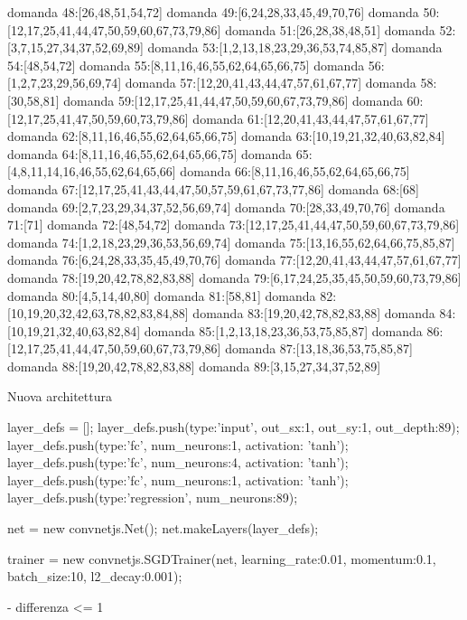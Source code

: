domanda 48:[26,48,51,54,72]
domanda 49:[6,24,28,33,45,49,70,76]
domanda 50:[12,17,25,41,44,47,50,59,60,67,73,79,86]
domanda 51:[26,28,38,48,51]
domanda 52:[3,7,15,27,34,37,52,69,89]
domanda 53:[1,2,13,18,23,29,36,53,74,85,87]
domanda 54:[48,54,72]
domanda 55:[8,11,16,46,55,62,64,65,66,75]
domanda 56:[1,2,7,23,29,56,69,74]
domanda 57:[12,20,41,43,44,47,57,61,67,77]
domanda 58:[30,58,81]
domanda 59:[12,17,25,41,44,47,50,59,60,67,73,79,86]
domanda 60:[12,17,25,41,47,50,59,60,73,79,86]
domanda 61:[12,20,41,43,44,47,57,61,67,77]
domanda 62:[8,11,16,46,55,62,64,65,66,75]
domanda 63:[10,19,21,32,40,63,82,84]
domanda 64:[8,11,16,46,55,62,64,65,66,75]
domanda 65:[4,8,11,14,16,46,55,62,64,65,66]
domanda 66:[8,11,16,46,55,62,64,65,66,75]
domanda 67:[12,17,25,41,43,44,47,50,57,59,61,67,73,77,86]
domanda 68:[68]
domanda 69:[2,7,23,29,34,37,52,56,69,74]
domanda 70:[28,33,49,70,76]
domanda 71:[71]
domanda 72:[48,54,72]
domanda 73:[12,17,25,41,44,47,50,59,60,67,73,79,86]
domanda 74:[1,2,18,23,29,36,53,56,69,74]
domanda 75:[13,16,55,62,64,66,75,85,87]
domanda 76:[6,24,28,33,35,45,49,70,76]
domanda 77:[12,20,41,43,44,47,57,61,67,77]
domanda 78:[19,20,42,78,82,83,88]
domanda 79:[6,17,24,25,35,45,50,59,60,73,79,86]
domanda 80:[4,5,14,40,80]
domanda 81:[58,81]
domanda 82:[10,19,20,32,42,63,78,82,83,84,88]
domanda 83:[19,20,42,78,82,83,88]
domanda 84:[10,19,21,32,40,63,82,84]
domanda 85:[1,2,13,18,23,36,53,75,85,87]
domanda 86:[12,17,25,41,44,47,50,59,60,67,73,79,86]
domanda 87:[13,18,36,53,75,85,87]
domanda 88:[19,20,42,78,82,83,88]
domanda 89:[3,15,27,34,37,52,89]


Nuova architettura


layer_defs = [];
layer_defs.push({type:'input', out_sx:1, out_sy:1, out_depth:89});
layer_defs.push({type:'fc', num_neurons:1, activation: 'tanh'});
layer_defs.push({type:'fc', num_neurons:4, activation: 'tanh'});
layer_defs.push({type:'fc', num_neurons:1, activation: 'tanh'});
layer_defs.push({type:'regression', num_neurons:89});

net = new convnetjs.Net();
net.makeLayers(layer_defs);

trainer = new convnetjs.SGDTrainer(net, {learning_rate:0.01, momentum:0.1, batch_size:10, l2_decay:0.001});

- differenza <= 1

